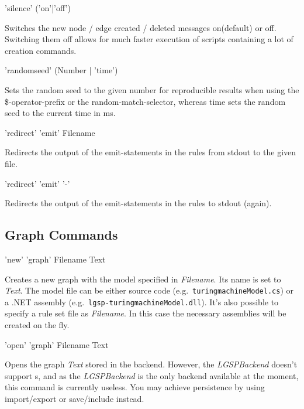 \begin{rail}
'silence' ('on'|'off')
\end{rail}
Switches the new node / edge created / deleted messages on(default) or off.
Switching them off allows for much faster execution of scripts containing a lot of creation commands.

\begin{rail}
'randomseed' (Number | 'time')
\end{rail}
Sets the random seed to the given number for reproducible results when using the \$-operator-prefix or the random-match-selector, whereas time sets the random seed to the current time in ms.

\begin{rail}
'redirect' 'emit' Filename
\end{rail}
Redirects the output of the emit-statements in the rules from stdout to the given file.

\begin{rail}
'redirect' 'emit' '-'
\end{rail}
Redirects the output of the emit-statements in the rules to stdout (again).


\subsection{Graph Commands}
\label{graphcommands}

\begin{rail}
  'new' 'graph' Filename Text 
\end{rail}
Creates a new graph with the model specified in \emph{Filename}.
Its name is set to \emph{Text}. 
The model file can be either source code (e.g.\ \texttt{turing\textunderscore machineModel.cs}) or a .NET assembly (e.g.\ \texttt{lgsp-turing\textunderscore machineModel.dll}).
It's also possible to specify a rule set file as \emph{Filename}. 
In this case the necessary assemblies will be created on the fly.

\begin{rail}
  'open' 'graph' Filename Text
\end{rail}
Opens the graph \emph{Text} stored in the backend. 
However, the \emph{LGSPBackend} doesn't support s, and as the \emph{LGSPBackend} is the only backend available at the moment, this command is currently useless.
You may achieve persistence by using import/export or save/include instead.

